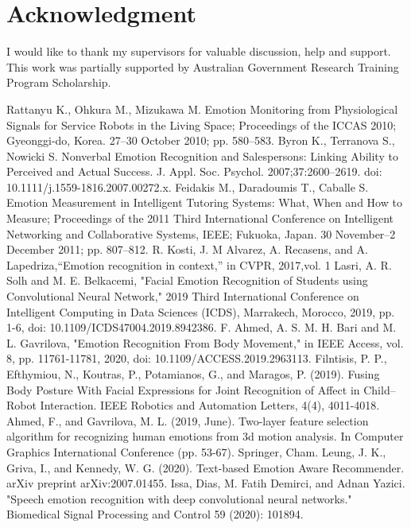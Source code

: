 \documentclass[conference]{IEEEtran}
\begin{document}
\section*{Acknowledgment}
I would like to thank my supervisors for valuable discussion, help and support. This work was partially supported by Australian Government Research Training Program Scholarship.

\begin{thebibliography}{00}
 Rattanyu K., Ohkura M., Mizukawa M. Emotion Monitoring from Physiological Signals for Service Robots in the Living Space; Proceedings of the ICCAS 2010; Gyeonggi-do, Korea. 27–30 October 2010; pp. 580–583.
 Byron K., Terranova S., Nowicki S. Nonverbal Emotion Recognition and Salespersons: Linking Ability to Perceived and Actual Success. J. Appl. Soc. Psychol. 2007;37:2600–2619. doi: 10.1111/j.1559-1816.2007.00272.x.
 Feidakis M., Daradoumis T., Caballe S. Emotion Measurement in Intelligent Tutoring Systems: What, When and How to Measure; Proceedings of the 2011 Third International Conference on Intelligent Networking and Collaborative Systems, IEEE; Fukuoka, Japan. 30 November–2 December 2011; pp. 807–812.
 R. Kosti, J. M Alvarez, A. Recasens, and A. Lapedriza,“Emotion recognition in context,” in CVPR, 2017,vol. 1
 Lasri, A. R. Solh and M. E. Belkacemi, "Facial Emotion Recognition of Students using Convolutional Neural Network," 2019 Third International Conference on Intelligent Computing in Data Sciences (ICDS), Marrakech, Morocco, 2019, pp. 1-6, doi: 10.1109/ICDS47004.2019.8942386.
  F. Ahmed, A. S. M. H. Bari and M. L. Gavrilova, "Emotion Recognition From Body Movement," in IEEE Access, vol. 8, pp. 11761-11781, 2020, doi: 10.1109/ACCESS.2019.2963113.
  Filntisis, P. P., Efthymiou, N., Koutras, P., Potamianos, G., and Maragos, P. (2019). Fusing Body Posture With Facial Expressions for Joint Recognition of Affect in Child–Robot Interaction. IEEE Robotics and Automation Letters, 4(4), 4011-4018.
 Ahmed, F., and Gavrilova, M. L. (2019, June). Two-layer feature selection algorithm for recognizing human emotions from 3d motion analysis. In Computer Graphics International Conference (pp. 53-67). Springer, Cham.
  Leung, J. K., Griva, I., and Kennedy, W. G. (2020). Text-based Emotion Aware Recommender. arXiv preprint arXiv:2007.01455.
 Issa, Dias, M. Fatih Demirci, and Adnan Yazici. "Speech emotion recognition with deep convolutional neural networks." Biomedical Signal Processing and Control 59 (2020): 101894.

\end{thebibliography}
\end{document}
